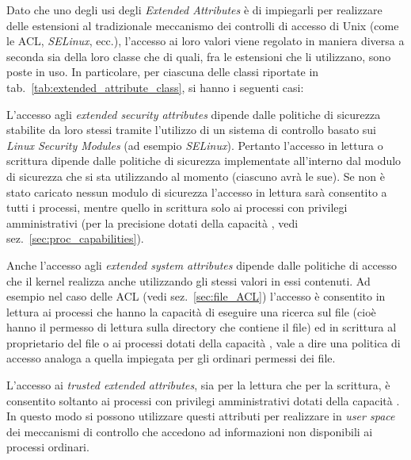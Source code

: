 Dato che uno degli usi degli \textit{Extended Attributes} è di impiegarli per
realizzare delle estensioni al tradizionale meccanismo dei controlli di
accesso di Unix (come le ACL, \textit{SELinux}, ecc.), l'accesso ai loro
valori viene regolato in maniera diversa a seconda sia della loro classe che
di quali, fra le estensioni che li utilizzano, sono poste in uso. In
particolare, per ciascuna delle classi riportate in
tab.~\ref{tab:extended_attribute_class}, si hanno i seguenti casi:
\begin{basedescript}{\desclabelwidth{1.7cm}\desclabelstyle{\nextlinelabel}}
\item[\texttt{security}] L'accesso agli \textit{extended security attributes}
  dipende dalle politiche di sicurezza stabilite da loro stessi tramite
  l'utilizzo di un sistema di controllo basato sui \textit{Linux Security
    Modules} (ad esempio \textit{SELinux}). Pertanto l'accesso in lettura o
  scrittura dipende dalle politiche di sicurezza implementate all'interno dal
  modulo di sicurezza che si sta utilizzando al momento (ciascuno avrà le
  sue). Se non è stato caricato nessun modulo di sicurezza l'accesso in
  lettura sarà consentito a tutti i processi, mentre quello in scrittura solo
  ai processi con privilegi amministrativi (per la precisione dotati della
  capacità , vedi sez.~\ref{sec:proc_capabilities}).

\item[\texttt{system}] Anche l'accesso agli \textit{extended system
    attributes} dipende dalle politiche di accesso che il kernel realizza
  anche utilizzando gli stessi valori in essi contenuti. Ad esempio nel caso
  delle ACL (vedi sez.~\ref{sec:file_ACL}) l'accesso è consentito in lettura
  ai processi che hanno la capacità di eseguire una ricerca sul file (cioè
  hanno il permesso di lettura sulla directory che contiene il file) ed in
  scrittura al proprietario del file o ai processi dotati della capacità
  , vale a dire una politica di accesso analoga a quella
  impiegata per gli ordinari permessi dei file.

\item[\texttt{trusted}] L'accesso ai \textit{trusted extended attributes}, sia
  per la lettura che per la scrittura, è consentito soltanto ai processi con
  privilegi amministrativi dotati della capacità . In
  questo modo si possono utilizzare questi attributi per realizzare in
  \textit{user space} dei meccanismi di controllo che accedono ad informazioni
  non disponibili ai processi ordinari.


\end{basedescript}
